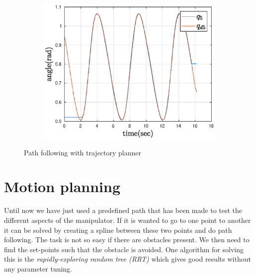 \begin{figure}[htbp]
\begin{subfigure}[htbp]{0.45\textwidth}
        \includegraphics[width = \picsSiz\linewidth]{img/pathF5ff.eps}
        \caption{ }
    \end{subfigure}
    \caption{Path following with trajectory planner}
    \label{fig:pathTSff}
\end{figure}
\newpage

\section{Motion planning}
Until now we have just used a predefined path that has been made to test the different aspects of the manipulator. If it is wanted to go to one point to another it can be solved by creating a spline between these two points and do path following\cite{Spline}\cite{MatlabSpline2}\cite{MatlabSpline}. The task is not so easy if there are obstacles present. We then need to find the set-points such that the obstacle is avoided. One algorithm for solving this is the \textit{rapidly-exploring random tree (RRT)} which gives good results without any parameter tuning\cite{Lavalle}. 

